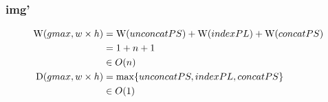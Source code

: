     \subsubsection*{img'}
      \begin{equation*}
      \begin{split}
      \textrm{W}(gmax, w \times h)
            & = \textrm{W}(unconcatPS) + \textrm{W}(indexPL) + \textrm{W}(concatPS) \\
            & = 1 + n + 1 \\
            & \in O(n) \\
      \textrm{D}(gmax, w \times h)
          & = \max \{ unconcatPS, indexPL, concatPS \} \\
          & \in O(1)
      \end{split}
      \end{equation*}
    

